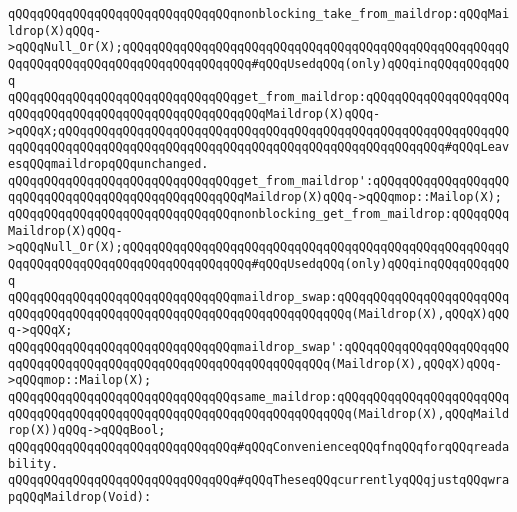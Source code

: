 \newline
\verb|qQQqqQQqqQQqqQQqqQQqqQQqqQQqqQQqnonblocking_take_from_maildrop:qQQqMaildrop(X)qQQq->qQQqNull_Or(X);qQQqqQQqqQQqqQQqqQQqqQQqqQQqqQQqqQQqqQQqqQQqqQQqqQQqqQQqqQQqqQQqqQQqqQQqqQQqqQQqqQQqqQQq#qQQqUsedqQQq(only)qQQqinqQQqqQQqqQQq|\newline
\newline
\verb|qQQqqQQqqQQqqQQqqQQqqQQqqQQqqQQqget_from_maildrop:qQQqqQQqqQQqqQQqqQQqqQQqqQQqqQQqqQQqqQQqqQQqqQQqqQQqqQQqMaildrop(X)qQQq->qQQqX;qQQqqQQqqQQqqQQqqQQqqQQqqQQqqQQqqQQqqQQqqQQqqQQqqQQqqQQqqQQqqQQqqQQqqQQqqQQqqQQqqQQqqQQqqQQqqQQqqQQqqQQqqQQqqQQqqQQqqQQqqQQq#qQQqLeavesqQQqmaildropqQQqunchanged.|\newline
\verb|qQQqqQQqqQQqqQQqqQQqqQQqqQQqqQQqget_from_maildrop':qQQqqQQqqQQqqQQqqQQqqQQqqQQqqQQqqQQqqQQqqQQqqQQqqQQqMaildrop(X)qQQq->qQQqmop::Mailop(X);|\newline
\newline
\verb|qQQqqQQqqQQqqQQqqQQqqQQqqQQqqQQqnonblocking_get_from_maildrop:qQQqqQQqMaildrop(X)qQQq->qQQqNull_Or(X);qQQqqQQqqQQqqQQqqQQqqQQqqQQqqQQqqQQqqQQqqQQqqQQqqQQqqQQqqQQqqQQqqQQqqQQqqQQqqQQqqQQqqQQq#qQQqUsedqQQq(only)qQQqinqQQqqQQqqQQq|\newline
\newline
\verb|qQQqqQQqqQQqqQQqqQQqqQQqqQQqqQQqmaildrop_swap:qQQqqQQqqQQqqQQqqQQqqQQqqQQqqQQqqQQqqQQqqQQqqQQqqQQqqQQqqQQqqQQqqQQqqQQq(Maildrop(X),qQQqX)qQQq->qQQqX;|\newline
\verb|qQQqqQQqqQQqqQQqqQQqqQQqqQQqqQQqmaildrop_swap':qQQqqQQqqQQqqQQqqQQqqQQqqQQqqQQqqQQqqQQqqQQqqQQqqQQqqQQqqQQqqQQqqQQq(Maildrop(X),qQQqX)qQQq->qQQqmop::Mailop(X);|\newline
\newline
\verb|qQQqqQQqqQQqqQQqqQQqqQQqqQQqqQQqsame_maildrop:qQQqqQQqqQQqqQQqqQQqqQQqqQQqqQQqqQQqqQQqqQQqqQQqqQQqqQQqqQQqqQQqqQQqqQQq(Maildrop(X),qQQqMaildrop(X))qQQq->qQQqBool;|\newline
\newline
\verb|qQQqqQQqqQQqqQQqqQQqqQQqqQQqqQQq#qQQqConvenienceqQQqfnqQQqforqQQqreadability.|\newline
\verb|qQQqqQQqqQQqqQQqqQQqqQQqqQQqqQQq#qQQqTheseqQQqcurrentlyqQQqjustqQQqwrapqQQqMaildrop(Void):|\newline
